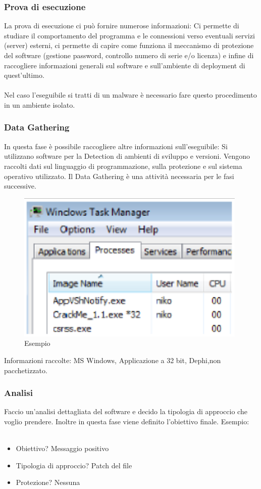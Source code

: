 \documentclass[8pt]{extarticle}
\begin{document}
\subsubsection{Prova di esecuzione}
La prova di esecuzione ci può fornire numerose informazioni:
Ci permette di studiare il comportamento del programma e le connessioni verso eventuali servizi 
(server) esterni, ci permette di capire come funziona il meccanismo di protezione del software 
(gestione password, controllo numero di serie e/o licenza) e infine di raccogliere informazioni 
generali sul software e sull’ambiente di deployment di quest’ultimo.\\\\
Nel caso l’eseguibile si tratti di un malware è necessario fare questo procedimento in un 
ambiente isolato. 
\subsubsection{Data Gathering}
In questa fase è possibile raccogliere altre informazioni sull’eseguibile:
Si utilizzano software per la Detection di ambienti di sviluppo e versioni.
Vengono raccolti dati sul linguaggio di programmazione, sulla protezione e sul 
sistema operativo utilizzato. Il Data Gathering è una attività necessaria per le fasi successive.
\begin{figure}[H]
    \center
    \includegraphics[scale=0.3]{images/RCE1.png}
    \caption{Esempio}\label{fig:1}
\end{figure}
\noindent
Informazioni raccolte: MS Windows, Applicazione a 32 bit, Dephi,non pacchetizzato.
\subsubsection{Analisi}
Faccio un’analisi dettagliata del software e decido la tipologia di approccio che voglio prendere.
Inoltre in questa fase viene definito l’obiettivo finale.
Esempio:\\\\
\begin{itemize}
    \item Obiettivo? Messaggio positivo
    \item Tipologia di approccio? Patch del file
    \item Protezione? Nessuna
\end{itemize}
\end{document}
